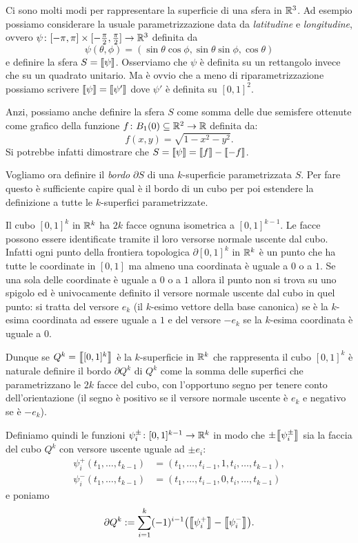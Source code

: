 \begin{example}
Ci sono molti modi per rappresentare la superficie di una sfera in ${\mathbb R}^3$.
Ad esempio possiamo considerare la usuale parametrizzazione 
data da \emph{latitudine} e \emph{longitudine}, ovvero
$\psi\colon [-\pi,\pi]\times [-\tfrac{\pi}{2},\tfrac{\pi}{2}] \to {\mathbb R}^3$ definita da
\[
  \psi(\theta,\phi) = (\sin \theta \cos \phi, \sin \theta \sin \phi, \cos \theta)
\]
e definire la sfera $S={\left\llbracket \psi \right\rrbracket}$.
Osserviamo che $\psi$ è definita su un rettangolo invece che 
su un quadrato unitario.
Ma è ovvio che a meno di riparametrizzazione possiamo 
scrivere ${\left\llbracket \psi \right\rrbracket} = {\left\llbracket \psi' \right\rrbracket}$ dove $\psi'$ 
è definita su $[0,1]^2$.

Anzi, possiamo anche definire la sfera $S$ 
come somma delle due semisfere ottenute come grafico 
della funzione $f\colon B_1(0)\subseteq {\mathbb R}^2 \to {\mathbb R}$ definita da:
\[
  f(x,y) = \sqrt{1-x^2-y^2}.
\]
Si potrebbe infatti dimostrare che 
$S= {\left\llbracket \psi \right\rrbracket} = {\left\llbracket f \right\rrbracket} - {\left\llbracket -f \right\rrbracket}$.
\end{example}

Vogliamo ora definire il \emph{bordo} $\partial S$ di una $k$-superficie parametrizzata $S$.
Per fare questo è sufficiente capire qual è il bordo di un cubo 
per poi estendere la definizione a tutte le $k$-superfici parametrizzate. 

Il cubo $[0,1]^k$ in ${\mathbb R}^k$ ha $2k$ facce ognuna isometrica a $[0,1]^{k-1}$. 
Le facce possono essere identificate tramite il loro versorse normale uscente 
dal cubo.
Infatti ogni punto della frontiera topologica $\partial [0,1]^k$ in ${\mathbb R}^k$ 
è un punto che ha tutte le coordinate in $[0,1]$ ma almeno 
una coordinata è uguale a $0$ o a $1$.
Se una sola delle coordinate è uguale a $0$ o a $1$ 
allora il punto non si trova su uno spigolo ed è univocamente 
definito il versore normale uscente dal cubo in quel punto:
si tratta del versore $e_k$ (il $k$-esimo vettore della base canonica) 
se è la $k$-esima coordinata ad essere uguale a $1$ e del versore $-e_k$ 
se la $k$-esima coordinata è uguale a $0$.

Dunque se $Q^k={\left\llbracket [0,1]^k \right\rrbracket}$ è la $k$-superficie in ${\mathbb R}^k$ 
che rappresenta il cubo $[0,1]^k$
è naturale definire il bordo $\partial Q^k$ di $Q^k$ come la somma delle superfici 
che parametrizzano le $2k$ facce del cubo, 
con l'opportuno segno per tenere conto dell'orientazione (il segno è positivo se il versore normale uscente è $e_k$ e negativo se è $-e_k$).

Definiamo quindi le funzioni $\psi^\pm_i\colon [0,1]^{k-1} \to {\mathbb R}^k$ 
in modo che $\pm{\left\llbracket \psi_i^\pm \right\rrbracket}$ sia la faccia del cubo $Q^k$ 
con versore uscente uguale ad $\pm e_i$:
\begin{align*}
    \psi_i^+(t_1, \dots, t_{k-1}) &= (t_1, \dots, t_{i-1}, 1, t_i, \dots, t_{k-1}),\\
    \psi_i^-(t_1, \dots, t_{k-1}) &= (t_1, \dots, t_{i-1}, 0, t_i, \dots, t_{k-1})
\end{align*}
e poniamo 
\[
  \partial Q^k := \sum_{i=1}^k (-1)^{i-1}{\left( {\left\llbracket \psi_i^+ \right\rrbracket} - {\left\llbracket \psi_i^- \right\rrbracket} \right)}.
\]

